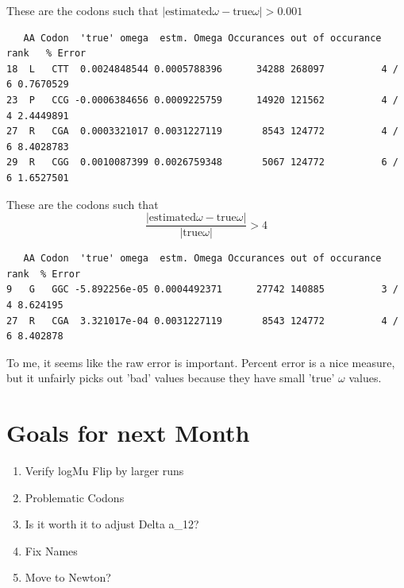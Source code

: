 These are the codons such that $|\mbox{estimated}\omega - \mbox{true}\omega| > 0.001$

\begin{verbatim}
   AA Codon  'true' omega  estm. Omega Occurances out of occurance rank   % Error
18  L   CTT  0.0024848544 0.0005788396      34288 268097          4 / 6 0.7670529
23  P   CCG -0.0006384656 0.0009225759      14920 121562          4 / 4 2.4449891
27  R   CGA  0.0003321017 0.0031227119       8543 124772          4 / 6 8.4028783
29  R   CGG  0.0010087399 0.0026759348       5067 124772          6 / 6 1.6527501
\end{verbatim}

These are the codons such that $$\frac{|\mbox{estimated}\omega - \mbox{true}\omega|}{|\mbox{true}\omega|} > 4$$

\begin{verbatim}
   AA Codon  'true' omega  estm. Omega Occurances out of occurance rank  % Error
9   G   GGC -5.892256e-05 0.0004492371      27742 140885          3 / 4 8.624195
27  R   CGA  3.321017e-04 0.0031227119       8543 124772          4 / 6 8.402878
\end{verbatim}





To me, it seems like the raw error is important. Percent error is a nice measure, but it unfairly picks out 'bad' values because they have small 'true' $\omega$ values.

\section{Goals for next Month}
\begin{enumerate}
\item Verify logMu Flip by larger runs
\item Problematic Codons
\item Is it worth it to adjust Delta a\_12?
\item Fix Names
\item Move to Newton?
\end{enumerate}


